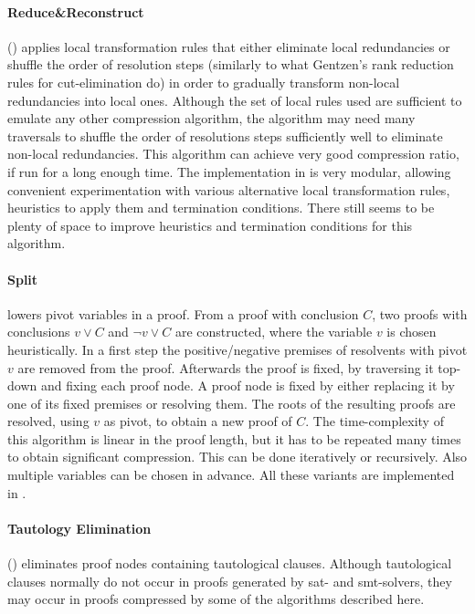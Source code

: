 \documentclass{llncs}
\begin{document}
\paragraph{Reduce\&Reconstruct} () \cite{RedRec} applies local transformation
rules that either eliminate local redundancies or shuffle the order of resolution steps (similarly to what Gentzen's rank reduction rules for cut-elimination do) in order to gradually transform non-local redundancies into local ones. Although the set of local rules used are sufficient to emulate any
other compression algorithm, the algorithm may need many traversals to shuffle the order of resolutions steps sufficiently well to eliminate non-local redundancies. This algorithm can achieve very good
compression ratio, if run for a long enough time.
%
The implementation in \skeptik is very modular, allowing convenient experimentation with various alternative local transformation rules, heuristics to apply
them and termination conditions. There still seems to be plenty of space to improve heuristics and termination conditions for this algorithm.


\paragraph{Split} \cite{CottonSplit} lowers pivot variables in a proof. 
From a proof with conclusion $C$, two proofs with conclusions $v \vee C$ and $\neg{v} \vee C$ are constructed,  where the variable $v$ is chosen heuristically.
In a first step the positive/negative premises of resolvents with pivot $v$ are removed from the proof.
Afterwards the proof is fixed, by traversing it top-down and fixing each proof node.
A proof node is fixed by either replacing it by one of its fixed premises or resolving them.
The roots of the resulting proofs are resolved, using $v$ as pivot, to obtain a new proof of $C$.
The time-complexity of this algorithm is linear in the proof length, but it has to be repeated many times to obtain significant compression. This can be done iteratively or recursively. Also multiple variables can be chosen in advance. 
All these variants are implemented in {\skeptik}.

\paragraph{Tautology Elimination} () eliminates proof nodes containing tautological clauses. Although tautological clauses normally do not occur in proofs generated by sat- and smt-solvers, they may occur in proofs compressed by some of the algorithms described here.
\end{document}
